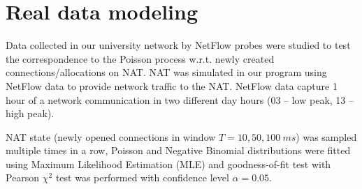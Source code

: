 \documentclass{llncs}
\begin{document}
\section{Real data modeling}
Data collected in our university network by NetFlow probes were studied to test the correspondence to the Poisson process
w.r.t. newly created connections/allocations on NAT. NAT was simulated in our program using
NetFlow data to provide network traffic to the NAT. NetFlow data capture 1 hour of a network communication in two different
day hours (03 -- low peak, 13 -- high peak).

NAT state (newly opened connections in window $T=10, 50, 100~ms$)
was sampled multiple times in a row, Poisson and Negative Binomial distributions were fitted using Maximum Likelihood Estimation (MLE)
and goodness-of-fit test with Pearson $\chi^2$ test was performed with confidence level $\alpha=0.05$.
\end{document}
